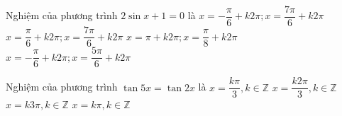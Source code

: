 \begin{ex}%
Nghiệm của phương trình $2 \sin x+1=0$ là
\choice
{\True $x=-\dfrac{\pi}{6}+k 2 \pi ; x=\dfrac{7 \pi}{6}+k 2 \pi$}
{$x=\dfrac{\pi}{6}+k 2 \pi ; x=\dfrac{7 \pi}{6}+k 2 \pi$}
{$x=\pi+k 2 \pi ; x=\dfrac{\pi}{8}+k 2 \pi$}
{$x=-\dfrac{\pi}{6}+k 2 \pi ; x=\dfrac{5 \pi}{6}+k 2 \pi$}
\loigiai{
Ta có: $2 \sin x+1=0 \Leftrightarrow \sin x=\dfrac{-1}{2} \Leftrightarrow\left[\begin{array}{l}x=-\dfrac{\pi}{6}+k 2 \pi \\ x=\pi+\dfrac{\pi}{6}+k 2 \pi\end{array} \Leftrightarrow\left[\begin{array}{l}x=-\dfrac{\pi}{6}+k 2 \pi \\ x=\dfrac{7 \pi}{6}+k 2 \pi\end{array} \quad(k \in \mathbb{Z})\right.\right.$\\
Vậy phương trình có nghiệm là $x=-\dfrac{\pi}{6}+k 2 \pi ; x=\dfrac{7 \pi}{6}+k 2 \pi$.
}
\end{ex}


\begin{ex}%
Nghiệm của phương trình $\tan 5 x=\tan 2 x$ là
\choice
{\True $x=\dfrac{k \pi}{3}, k \in \mathbb{Z}$}
{$x=\dfrac{k 2 \pi}{3}, k \in \mathbb{Z}$}
{$x=k 3 \pi, k \in \mathbb{Z}$}
{$x=k \pi, k \in \mathbb{Z}$}
\end{ex}





